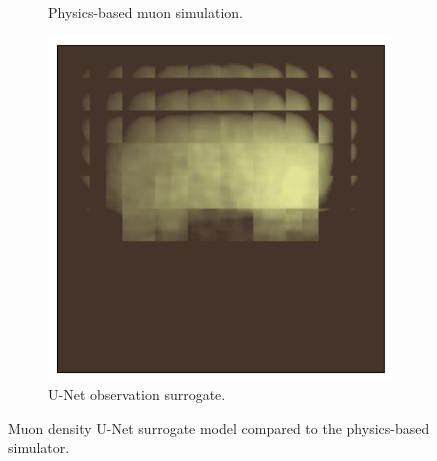 \begin{figure}[t!]
\begin{subfigure}[t]{0.32\linewidth}
        \caption{Physics-based muon simulation.}
        \label{fig:muon_obs_simulated}
    \end{subfigure}
    \hfill
    \begin{subfigure}[t]{0.32\linewidth}
        \centering
        \includegraphics[width=0.9\linewidth]{figures/ivae/muon/muon-obs-surrogate.png}
        \caption{U-Net observation surrogate.}
        \label{fig:muon_obs_surrogate}
    \end{subfigure}
    \caption{Muon density U-Net surrogate model compared to the physics-based simulator.}
    \label{fig:muon_obs_model}
\end{figure}


